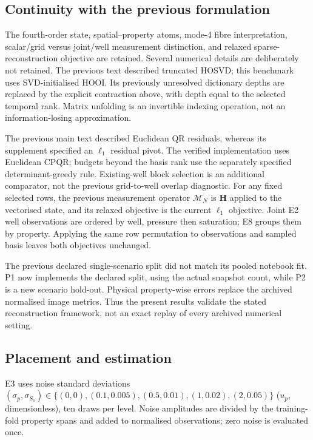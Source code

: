 \subsection{Continuity with the previous formulation}
The fourth-order state, spatial--property atoms, mode-4 fibre interpretation, scalar/grid versus joint/well measurement distinction, and relaxed sparse-reconstruction objective are retained. Several numerical details are deliberately not retained. The previous text described truncated HOSVD; this benchmark uses SVD-initialised HOOI. Its previously unresolved dictionary depths are replaced by the explicit contraction above, with depth equal to the selected temporal rank. Matrix unfolding is an invertible indexing operation, not an information-losing approximation.

The previous main text described Euclidean QR residuals, whereas its supplement specified an $\ell_1$ residual pivot. The verified implementation uses Euclidean CPQR; budgets beyond the basis rank use the separately specified determinant-greedy rule. Existing-well block selection is an additional comparator, not the previous grid-to-well overlap diagnostic. For any fixed selected rows, the previous measurement operator $\mathcal{M}_N$ is $\mathbf{H}$ applied to the vectorised state, and its relaxed objective is the current $\ell_1$ objective. Joint E2 well observations are ordered by well, pressure then saturation; E8 groups them by property. Applying the same row permutation to observations and sampled basis leaves both objectives unchanged.

The previous declared single-scenario split did not match its pooled notebook fit. P1 now implements the declared split, using the actual snapshot count, while P2 is a new scenario hold-out. Physical property-wise errors replace the archived normalised image metrics. Thus the present results validate the stated reconstruction framework, not an exact replay of every archived numerical setting.

\subsection{Placement and estimation}
E3 uses noise standard deviations $(\sigma_p,\sigma_{S_o})\in\{(0,0),\allowbreak(0.1,0.005),\allowbreak(0.5,0.01),\allowbreak(1,0.02),\allowbreak(2,0.05)\}$ ($u_p$, dimensionless), ten draws per level. Noise amplitudes are divided by the training-fold property spans and added to normalised observations; zero noise is evaluated once.

